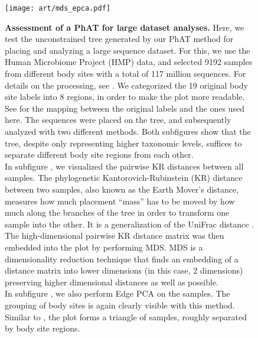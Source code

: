 \begin{figure}[hpbt]
    \centering
    \texttt{[image: art/mds\_epca.pdf]}
    \begin{subfigure}{0pt}
        \label{fig:hmp_mds_epca:sub:mds}
    \end{subfigure}
    \begin{subfigure}{0pt}
        \label{fig:hmp_mds_epca:sub:edge_pca}
    \end{subfigure}
    \caption[Assessment of a \acs{PhAT} for large dataset analyses]{
        \textbf{Assessment of a \acs{PhAT} for large dataset analyses.}
        Here, we test the unconstrained  tree generated by our \ac{PhAT} method
        for placing and analyzing a large sequence dataset.
        For this, we use the Human Microbiome Project (HMP) \citep{Huttenhower2012,Methe2012} data,
        and selected \num{9192} samples from different body sites with a total of 117 million sequences.
        For details on the processing, see .
        We categorized the 19 original body site labels into 8 regions, in order to make the plot more readable.
        See  for the mapping between the original labels and the ones used here.
        The sequences were placed on the tree, and subsequently analyzed with two different methods.
        Both subfigures show that the tree, despite only representing higher taxonomic levels,
        suffices to separate different body site regions from each other.
        \\
        In subfigure , we visualized the pairwise KR distances between all samples.
        The phylogenetic Kantorovich-Rubinstein (KR) distance \citep{Matsen2011a,Evans2012} between two samples,
        also known as the Earth Mover's distance,
        measures how much placement ``mass'' has to be moved by how much along the branches of the tree
        in order to transform one sample into the other.
        It is a generalization of the UniFrac distance \citep{Lozupone2005,Lozupone2007a}.
        The high-dimensional pairwise KR distance matrix was then embedded into the plot by performing \acf{MDS}.
        \ac{MDS} \citep{Mardia1978,Krzanowski1994,Everitt2010} is a dimensionality reduction technique that
        finds an embedding of a distance matrix into lower dimensions (in this case, \num{2} dimensions)
        preserving higher dimensional distances as well as possible.
        \\
        In subfigure , we also perform Edge PCA \citep{Matsen2011a}
        on the samples.
        The grouping of body sites is again clearly visible with this method.
        Similar to , the plot forms a triangle of samples,
        roughly separated by body site regions.
    }
    \label{fig:hmp_mds_epca}
\end{figure}


